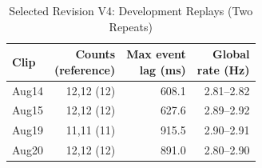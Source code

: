 \begin{table}[!t]
\caption{Selected Revision V4: Development Replays (Two Repeats)}
\label{tab:selectedreplay}
\centering\small
\begin{tabular}{lrrr}
\toprule
Clip & \shortstack{Counts\\(reference)} & \shortstack{Max event\\lag (ms)} & \shortstack{Global\\rate (Hz)}\\
\midrule
Aug14 & 12,12 (12) & 608.1 & 2.81--2.82\\
Aug15 & 12,12 (12) & 627.6 & 2.89--2.92\\
Aug19 & 11,11 (11) & 915.5 & 2.90--2.91\\
Aug20 & 12,12 (12) & 891.0 & 2.80--2.90\\
\bottomrule
\end{tabular}
\end{table}
